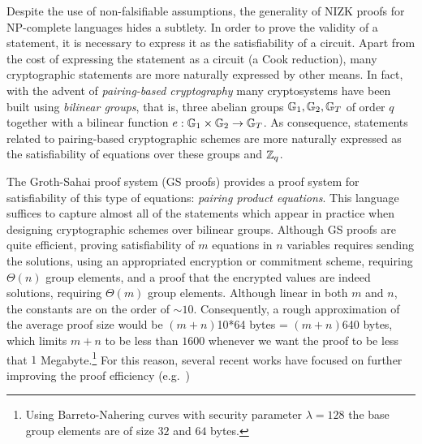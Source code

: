 Despite the use of non-falsifiable assumptions, the generality of NIZK proofs for NP-complete languages hides a subtlety. In order to prove the validity of a statement, it is necessary to express it as the satisfiability of a circuit. Apart from the cost of expressing the statement as a circuit (a Cook reduction), many cryptographic statements are more naturally expressed by other means.
In fact, with the advent of \emph{pairing-based cryptography} many cryptosystems have been built using \emph{bilinear groups}, that is, three abelian groups $\mathbb{G}_1,\mathbb{G}_2,\mathbb{G}_T$ of order $q$ together with a bilinear function $e:\mathbb{G}_1\times\mathbb{G}_2\to\mathbb{G}_T$. As consequence,
statements related to pairing-based cryptographic schemes are more naturally expressed as the satisfiability of equations over these groups and $\mathbb{Z}_q$.

The Groth-Sahai proof system (GS proofs) \cite{SIAMJC:GroSah12} 
  provides a proof system for satisfiability of this type of equations: \emph{pairing product equations}.
  This language suffices to capture almost all of the 
  statements which appear 
  in practice when designing cryptographic schemes over bilinear groups.  
Although GS proofs are quite efficient, proving satisfiability of $m$ equations in $n$ variables requires 
sending the solutions, using an appropriated encryption or commitment scheme, requiring $\Theta(n)$ group elements, and a proof that the encrypted values are indeed solutions, requiring $\Theta(m)$ group elements. Although linear in both $m$ and $n$, the constants are on the order of $\sim 10$. Consequently, a rough approximation of the average proof size would be $(m+n)$10*64 bytes = $(m+n)$640 bytes, which limits $m+n$ to be less than $1600$ whenever we want the proof to be less that $1$ Megabyte.\footnote{Using Barreto-Nahering curves with security parameter $\lambda=128$ the base group elements are of size $32$ and $64$ bytes.}  For this reason, several recent works 
 have focused on further improving the proof efficiency 
 (e.g.\ \cite{PKC:EscGro14,C:EHKRV13,TCC:Rafols15})


